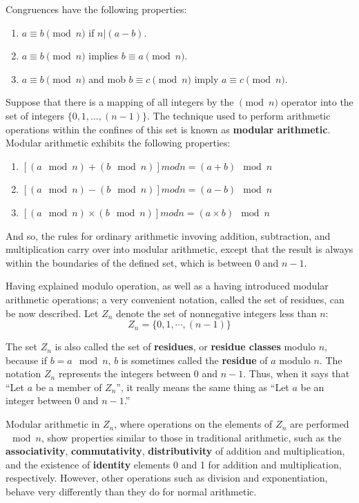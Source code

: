 Congruences have the following properties: 
\begin{enumerate}
\item $a \equiv b \pmod n$ if $n|(a-b)$.
\item $a \equiv b \pmod n$ implies $b \equiv a \pmod n$.
\item $a \equiv b \pmod n$ and mob $b \equiv c \pmod n$  imply $a \equiv c \pmod n$.
\end{enumerate}

Suppose that there is a mapping of all integers by the $\pmod n$ operator into the set of integers $\{0, 1, \dots, (n-1)\}$. The technique used to perform arithmetic operations within the confines of this set is known as \textbf{modular arithmetic}. Modular arithmetic exhibits the following properties:

\begin{enumerate}
\item $[(a \mod n) + (b \mod n)] mod n = (a + b) \mod n$
\item $[(a \mod n) - (b \mod n)] mod n = (a - b) \mod n$
\item $[(a \mod n) \times (b \mod n)] mod n = (a \times b) \mod n$
\end{enumerate}
And so, the rules for ordinary arithmetic invoving addition, subtraction, and multiplication carry over into modular arithmetic, except that the result is always within the boundaries of the defined set, which is between 0 and $n-1$.

Having explained modulo operation, as well as a having introduced modular arithmetic operations; a very convenient notation, called the set of residues, can be now described. Let $Z_{n}$ denote the set of nonnegative integers less than $n$:
\begin{equation}
Z_{n} = \{0,1,\cdots, (n-1)\}
\end{equation} 

The set $Z_{n}$ is also called the set of \textbf{residues}, or \textbf{residue classes} modulo $n$, because if $b=a \mod n$, $b$ is sometimes called the \textbf{residue} of $a$ modulo $n$. The notation $Z_{n}$ represents the integers between 0 and $n-1$. Thus, when it says that ``Let $a$ be a member of $Z_{n}$'', it really means the same thing as ``Let $a$ be an integer between 0 and $n-1$.''

Modular arithmetic in $Z_{n}$, where operations on the elements of $Z_{n}$ are performed $\mod n$, show properties similar to those in traditional arithmetic, such as the \textbf{associativity}, \textbf{commutativity}, \textbf{distributivity} of addition and multiplication, and the existence of \textbf{identity} elements 0 and 1 for addition and multiplication, respectively. However, other operations such as division and exponentiation, behave very differently than they do for normal arithmetic. 

